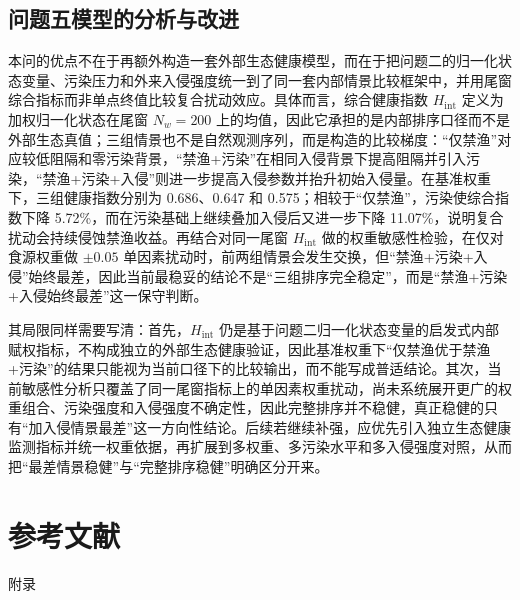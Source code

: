\documentclass{MMCStyle}
\begin{document}
\subsection{问题五模型的分析与改进}
本问的优点不在于再额外构造一套外部生态健康模型，而在于把问题二的归一化状态变量、污染压力和外来入侵强度统一到了同一套内部情景比较框架中，并用尾窗综合指标而非单点终值比较复合扰动效应。具体而言，综合健康指数 $H_{\mathrm{int}}$ 定义为加权归一化状态在尾窗 $N_w=200$ 上的均值，因此它承担的是内部排序口径而不是外部生态真值；三组情景也不是自然观测序列，而是构造的比较梯度：``仅禁渔''对应较低阻隔和零污染背景，``禁渔+污染''在相同入侵背景下提高阻隔并引入污染，``禁渔+污染+入侵''则进一步提高入侵参数并抬升初始入侵量。在基准权重下，三组健康指数分别为 0.686、0.647 和 0.575；相较于``仅禁渔''，污染使综合指数下降 5.72\%，而在污染基础上继续叠加入侵后又进一步下降 11.07\%，说明复合扰动会持续侵蚀禁渔收益。再结合对同一尾窗 $H_{\mathrm{int}}$ 做的权重敏感性检验，在仅对食源权重做 $\pm0.05$ 单因素扰动时，前两组情景会发生交换，但``禁渔+污染+入侵''始终最差，因此当前最稳妥的结论不是``三组排序完全稳定''，而是``禁渔+污染+入侵始终最差''这一保守判断。

其局限同样需要写清：首先，$H_{\mathrm{int}}$ 仍是基于问题二归一化状态变量的启发式内部赋权指标，不构成独立的外部生态健康验证，因此基准权重下``仅禁渔优于禁渔+污染''的结果只能视为当前口径下的比较输出，而不能写成普适结论。其次，当前敏感性分析只覆盖了同一尾窗指标上的单因素权重扰动，尚未系统展开更广的权重组合、污染强度和入侵强度不确定性，因此完整排序并不稳健，真正稳健的只有``加入侵情景最差''这一方向性结论。后续若继续补强，应优先引入独立生态健康监测指标并统一权重依据，再扩展到多权重、多污染水平和多入侵强度对照，从而把``最差情景稳健''与``完整排序稳健''明确区分开来。

\section{参考文献}


\appendix
\begin{center}
\heiti{} 附\hspace{1pc}录
\end{center}
\end{document}
